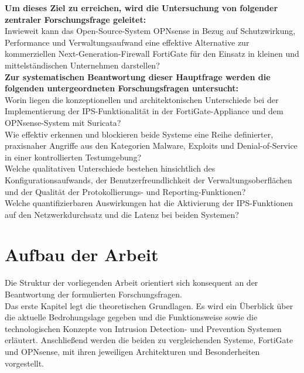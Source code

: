 \textbf{Um dieses Ziel zu erreichen, wird die Untersuchung von folgender zentraler Forschungsfrage geleitet:}\\

Inwieweit kann das Open-Source-System OPNsense in Bezug auf Schutzwirkung, Performance und Verwaltungsaufwand eine effektive Alternative zur kommerziellen Next-Generation-Firewall FortiGate für den Einsatz in kleinen und mittelständischen Unternehmen darstellen?\\

\textbf{Zur systematischen Beantwortung dieser Hauptfrage werden die folgenden untergeordneten Forschungsfragen untersucht:}\\

Worin liegen die konzeptionellen und architektonischen Unterschiede bei der Implementierung der IPS-Funktionalität in der FortiGate-Appliance und dem OPNsense-System mit Suricata?\\

Wie effektiv erkennen und blockieren beide Systeme eine Reihe definierter, praxisnaher Angriffe aus den Kategorien Malware, Exploits und Denial-of-Service in einer kontrollierten Testumgebung?\\

Welche qualitativen Unterschiede bestehen hinsichtlich des Konfigurationsaufwands, der Benutzerfreundlichkeit der Verwaltungsoberflächen und der Qualität der Protokollierungs- und Reporting-Funktionen?\\

Welche quantifizierbaren Auswirkungen hat die Aktivierung der IPS-Funktionen auf den Netzwerkdurchsatz und die Latenz bei beiden Systemen?

\section{Aufbau der Arbeit}

Die Struktur der vorliegenden Arbeit orientiert sich konsequent an der Beantwortung der formulierten Forschungsfragen.\\

Das erste Kapitel legt die theoretischen Grundlagen. Es wird ein Überblick über die aktuelle Bedrohungslage gegeben und die Funktionsweise sowie die technologischen Konzepte von Intrusion Detection- und Prevention Systemen erläutert. Anschließend werden die beiden zu vergleichenden Systeme, FortiGate und OPNsense, mit ihren jeweiligen Architekturen und Besonderheiten vorgestellt.\\


